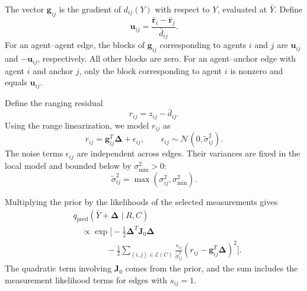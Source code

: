 The vector $\mathbf g_{ij}$ is the gradient of $d_{ij}(Y)$ with respect to $Y$, evaluated at $\bar Y$. Define
\[
    \mathbf u_{ij}
    =
    \frac{\bar{\mathbf r}_i-\bar{\mathbf r}_j}
    {\bar d_{ij}}.
\]
For an agent--agent edge, the blocks of $\mathbf g_{ij}$ corresponding to agents $i$ and $j$ are $\mathbf u_{ij}$ and $-\mathbf u_{ij}$, respectively. All other blocks are zero. For an agent--anchor edge with agent $i$ and anchor $j$, only the block corresponding to agent $i$ is nonzero and equals $\mathbf u_{ij}$.

Define the ranging residual
\[
    r_{ij}=z_{ij}-\bar d_{ij}.
\]
Using the range linearization, we model $r_{ij}$ as
\[
    r_{ij}
    =
    \mathbf g_{ij}^{T}\boldsymbol{\Delta}
    +\epsilon_{ij},
    \qquad
    \epsilon_{ij}\sim
    \mathcal N(0,\widetilde\sigma_{ij}^{2}).
\]
The noise terms $\epsilon_{ij}$ are independent across edges. Their variances are fixed in the local model and bounded below by $\sigma_{\min}^{2}>0$:
\[
    \widetilde\sigma_{ij}^{2}
    =
    \max(\sigma_{ij}^{2},\sigma_{\min}^{2}).
\]

Multiplying the prior by the likelihoods of the selected measurements gives
\begin{equation}
    \begin{aligned}
    &q_{\mathrm{pred}}
    (\bar Y+\boldsymbol{\Delta}\mid R,C)\\
    &\quad\propto
    \exp\Bigg[
    -\frac12\boldsymbol{\Delta}^{T}
    \mathbf J_0\boldsymbol{\Delta}\\
    &\qquad\qquad
    -\frac12
    \sum_{(i, j)\in\mathcal E(C)}
    \frac{s_{ij}}{\widetilde\sigma_{ij}^{2}}
    \left(
    r_{ij}-\mathbf g_{ij}^{T}\boldsymbol{\Delta}
    \right)^2
    \Bigg].
    \end{aligned}
    \label{eq:local_prediction_product}
\end{equation}
The quadratic term involving $\mathbf J_0$ comes from the prior, and the sum includes the measurement likelihood terms for edges with $s_{ij}=1$.

